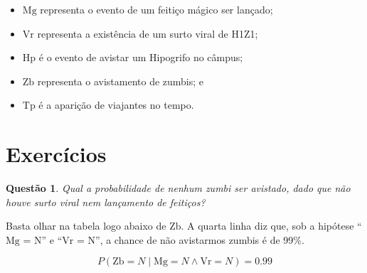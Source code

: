 \documentclass{article}
\newtheorem{question}{Questão}
\newcommand{\Mg}{\mathrm{Mg}}
\newcommand{\Vr}{\mathrm{Vr}}
\newcommand{\Hp}{\mathrm{Hp}}
\newcommand{\Zb}{\mathrm{Zb}}
\newcommand{\Tp}{\mathrm{Tp}}
\begin{document}
\begin{itemize}
    \item $\Mg$ representa o evento de um feitiço mágico ser lançado;
    \item $\Vr$ representa a existência de um surto viral de H1Z1;
    \item $\Hp$ é o evento de avistar um Hipogrifo no câmpus;
    \item $\Zb$ representa o avistamento de zumbis; e
    \item $\Tp$ é a aparição de viajantes no tempo.
\end{itemize}

\section{Exercícios}

\begin{question}
    Qual a probabilidade de nenhum zumbi ser avistado,
    dado que não houve surto viral nem lançamento de feitiços?
\end{question}

Basta olhar na tabela logo abaixo de $\Zb$.
A quarta linha diz que,
sob a hipótese ``$\Mg$ = N'' e ``$\Vr$ = N'',
a chance de não avistarmos zumbis é de 99\%.

\begin{equation*}
    P(\Zb = N \mid \Mg = N \wedge \Vr = N) = 0.99
\end{equation*}
\end{document}

